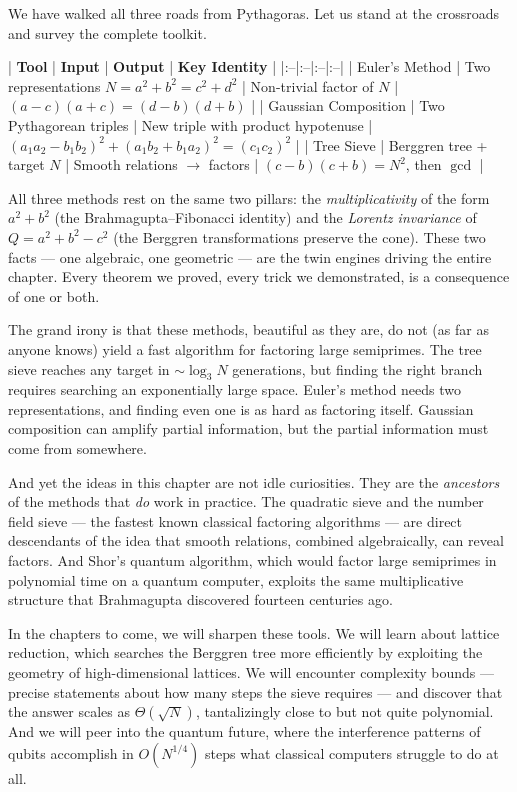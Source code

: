 \documentclass[11pt,twoside,openright]{book}
\theoremstyle{definition}
\theoremstyle{remark}
\begin{document}
We have walked all three roads from Pythagoras. Let us stand at the crossroads and survey the complete toolkit.

| \textbf{Tool} | \textbf{Input} | \textbf{Output} | \textbf{Key Identity} |
|:--|:--|:--|:--|
| Euler's Method | Two representations $N = a^2 + b^2 = c^2 + d^2$ | Non-trivial factor of $N$ | $(a - c)(a + c) = (d - b)(d + b)$ |
| Gaussian Composition | Two Pythagorean triples | New triple with product hypotenuse | $(a_1 a_2 - b_1 b_2)^2 + (a_1 b_2 + b_1 a_2)^2 = (c_1 c_2)^2$ |
| Tree Sieve | Berggren tree + target $N$ | Smooth relations $\rightarrow$ factors | $(c - b)(c + b) = N^2$, then $\gcd$ |

All three methods rest on the same two pillars: the \textit{multiplicativity} of the form $a^2 + b^2$ (the Brahmagupta--Fibonacci identity) and the \textit{Lorentz invariance} of $Q = a^2 + b^2 - c^2$ (the Berggren transformations preserve the cone). These two facts --- one algebraic, one geometric --- are the twin engines driving the entire chapter. Every theorem we proved, every trick we demonstrated, is a consequence of one or both.


The grand irony is that these methods, beautiful as they are, do not (as far as anyone knows) yield a fast algorithm for factoring large semiprimes. The tree sieve reaches any target in $\sim \log_3 N$ generations, but finding the right branch requires searching an exponentially large space. Euler's method needs two representations, and finding even one is as hard as factoring itself. Gaussian composition can amplify partial information, but the partial information must come from somewhere.

And yet the ideas in this chapter are not idle curiosities. They are the \textit{ancestors} of the methods that \textit{do} work in practice. The quadratic sieve and the number field sieve --- the fastest known classical factoring algorithms --- are direct descendants of the idea that smooth relations, combined algebraically, can reveal factors. And Shor's quantum algorithm, which would factor large semiprimes in polynomial time on a quantum computer, exploits the same multiplicative structure that Brahmagupta discovered fourteen centuries ago.

In the chapters to come, we will sharpen these tools. We will learn about lattice reduction, which searches the Berggren tree more efficiently by exploiting the geometry of high-dimensional lattices. We will encounter complexity bounds --- precise statements about how many steps the sieve requires --- and discover that the answer scales as $\Theta(\sqrt{N})$, tantalizingly close to but not quite polynomial. And we will peer into the quantum future, where the interference patterns of qubits accomplish in $O(N^{1/4})$ steps what classical computers struggle to do at all.
\end{document}
